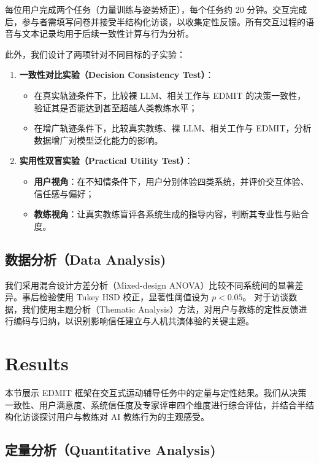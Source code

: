 \documentclass[sigconf]{acmart}
\begin{document}
每位用户完成两个任务（力量训练与姿势矫正），每个任务约 20 分钟。交互完成后，参与者需填写问卷并接受半结构化访谈，以收集定性反馈。所有交互过程的语音与文本记录均用于后续一致性计算与行为分析。

此外，我们设计了两项针对不同目标的子实验：
\begin{enumerate}
  \item \textbf{一致性对比实验（Decision Consistency Test）}：
  \begin{itemize}
    \item 在真实轨迹条件下，比较裸 LLM、相关工作与 \textsc{EDMIT} 的决策一致性，验证其是否能达到甚至超越人类教练水平；
    \item 在增广轨迹条件下，比较真实教练、裸 LLM、相关工作与 \textsc{EDMIT}，分析数据增广对模型泛化能力的影响。
  \end{itemize}
  \item \textbf{实用性双盲实验（Practical Utility Test）}：
  \begin{itemize}
    \item \textbf{用户视角}：在不知情条件下，用户分别体验四类系统，并评价交互体验、信任感与偏好；
    \item \textbf{教练视角}：让真实教练盲评各系统生成的指导内容，判断其专业性与贴合度。
  \end{itemize}
\end{enumerate}

\subsection{数据分析（Data Analysis)}

我们采用混合设计方差分析（Mixed-design ANOVA）比较不同系统间的显著差异。事后检验使用 Tukey HSD 校正，显著性阈值设为 $p < 0.05$。  
对于访谈数据，我们使用主题分析（Thematic Analysis）方法，对用户与教练的定性反馈进行编码与归纳，以识别影响信任建立与人机共演体验的关键主题。

\section{Results}
\label{sec:results}

本节展示 \textsc{EDMIT} 框架在交互式运动辅导任务中的定量与定性结果。我们从决策一致性、用户满意度、系统信任度及专家评审四个维度进行综合评估，并结合半结构化访谈探讨用户与教练对 AI 教练行为的主观感受。

\subsection{定量分析（Quantitative Analysis)}
\end{document}

